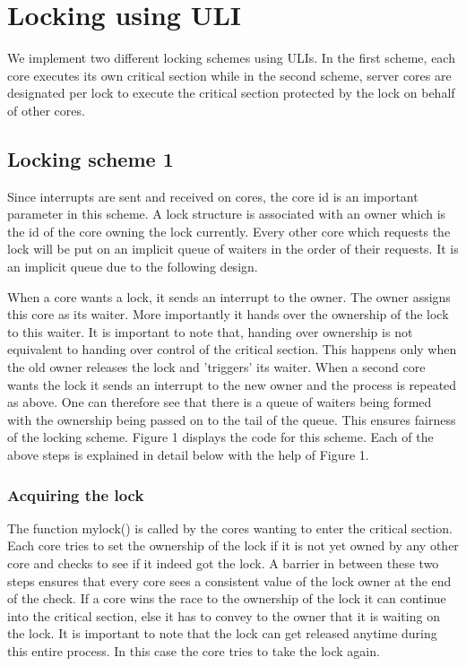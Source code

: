 \section{Locking using ULI}

We implement two different locking schemes using ULIs. In the first scheme, each
core executes its own critical section while in the second scheme, server cores
are designated per lock to execute the critical section protected by the lock on
behalf of other cores.

\subsection{Locking scheme 1}

Since interrupts are sent and received on cores, the core id is an important
parameter in this scheme. A lock structure is associated with an owner which is
the id of the core owning the lock currently. Every other core which requests
the lock will be put on an implicit queue of waiters in the order of their
requests. It is an implicit queue due to the following design.

When a core wants a lock, it sends an interrupt to the owner. The owner assigns
this core as its waiter. More importantly it hands over the ownership of the
lock to this waiter. It is important to note that, handing over ownership is not
equivalent to handing over control of the critical section. This happens only
when the old owner releases the lock and 'triggers' its waiter. When a second
core wants the lock it sends an interrupt to the new owner and the process is
repeated as above. One can therefore see that there is a queue of waiters being
formed with the ownership being passed on to the tail of the queue. This ensures
fairness of the locking scheme. Figure 1 displays the code for this scheme. Each
of the above steps is explained in detail below with the help of Figure 1.

\subsubsection{Acquiring the lock}

The function mylock() is called by the cores wanting to enter the critical
section. Each core tries to set the ownership of the lock if it is not yet owned
by any other core and checks to see if it indeed got the lock. A barrier in
between these two steps ensures that every core sees a consistent value of the
lock owner at the end of the check. If a core wins the race to the ownership of
the lock it can continue into the critical section, else it has to convey to the
owner that it is waiting on the lock. It is important to note that the lock can
get released anytime during this entire process. In this case the core tries to
take the lock again.

